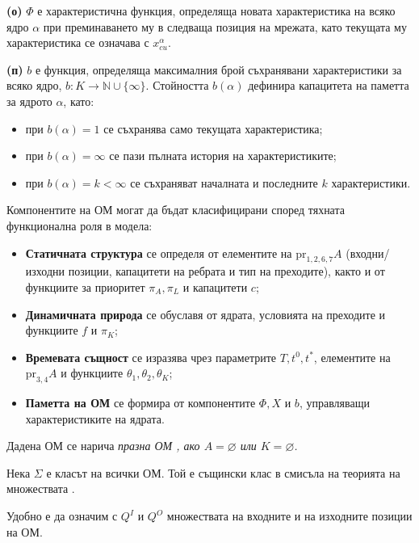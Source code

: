 {\bf (о)} $\Phi$ е характеристична функция, определяща новата характеристика на всяко ядро $\alpha$ при преминаването му в следваща позиция на мрежата, като текущата му характеристика се означава с $x^{\alpha}_{cu}$.

{\bf (п)} $b$ е функция, определяща максималния брой съхранявани характеристики за всяко ядро, $b: K \rightarrow \mathbb{N} \cup \{ \infty \}$. Стойността $b(\alpha)$ дефинира капацитета на паметта за ядрото $\alpha$, като:
\begin{itemize}[leftmargin=3.9em, nosep]
	\item при $b(\alpha) = 1$ се съхранява само текущата характеристика;
	\item при $b(\alpha) = \infty$ се пази пълната история на характеристиките;
	\item при $b(\alpha) = k < \infty$ се съхраняват началната и последните $k$ характеристики.
\end{itemize}

\vspace{0.3cm}

Компонентите на ОМ могат да бъдат класифицирани според тяхната функционална роля в модела:

\vspace{-0.3cm}

\begin{itemize}
	\item \textbf{Статичната структура} се определя от елементите на $\text{pr}_{1,2,6,7} A$ (входни/изходни позиции, капацитети на ребрата и тип на преходите), както и от функциите за приоритет $\pi_{A}, \pi_{L}$ и капацитети $c$;
	\item \textbf{Динамичната природа} се обуславя от ядрата, условията на преходите и функциите $f$ и $\pi_{K}$;
	\item \textbf{Времевата същност} се изразява чрез параметрите $T, t^{0}, t^{*}$, елементите на $\text{pr}_{3,4} A$ и функциите $\theta_{1}, \theta_{2}, \theta_{K}$;
	\item \textbf{Паметта на ОМ} се формира от компонентите $\Phi, X$ и $b$, управляващи характеристиките на ядрата.
\end{itemize}

Дадена ОМ се нарича \it празна ОМ \rm, ако $A = \varnothing$ или $K = \varnothing$.

Нека $\Sigma$ е класът на всички ОМ. Той е същински клас в смисъла на теорията на множествата \cite{TM1}.

Удобно е да означим с $Q^I$ и $Q^O$ множествата на входните и на изходните позиции на ОМ.


